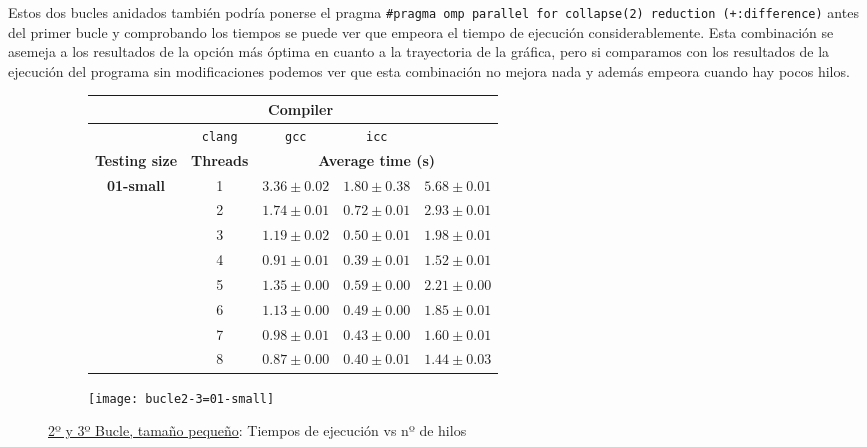 \par Estos dos bucles anidados también podría ponerse el pragma \texttt{\#pragma omp parallel for collapse(2) reduction (+:difference)}
antes del primer bucle y comprobando los tiempos se puede ver que empeora el tiempo de ejecución considerablemente. Esta combinación se asemeja a los resultados de 
la opción más óptima en cuanto a la trayectoria de la gráfica, pero si comparamos con los resultados de la ejecución del programa sin 
modificaciones podemos ver que esta combinación no mejora nada y además empeora cuando hay pocos hilos. 

\begin{figure}[H]
    \centering
    \begin{subfigure}{0.4\textwidth}
        \begin{adjustbox}{width=\textwidth} 
        \begin{tabular}{|c|c|c|c|c|}
            \hline
            \rowcolor{azul} \multicolumn{2}{|c|}{}&\multicolumn{3}{c|}{\textbf{Compiler}} \\ \hline
            \rowcolor{azul} \multicolumn{2}{|c|}{}&\texttt{clang}&\texttt{gcc}&\texttt{icc}\\ \hline
            \rowcolor{azul} \textbf{Testing size} & \textbf{Threads}&\multicolumn{3}{c|}{\textbf{Average time (s)}} \\ \hline
            \multirow{8}{1cm}{\textbf{01-small}} & 1 & \(3.36\pm{0.02}\) & \(1.80\pm{0.38}\) & \(5.68\pm{0.01}\) \\ \cline{2-5}
            & 2 & \(1.74\pm{0.01}\) & \(0.72\pm{0.01}\) & \(2.93\pm{0.01}\) \\ \cline{2-5}
            & 3 & \(1.19\pm{0.02}\) & \(0.50\pm{0.01}\) & \(1.98\pm{0.01}\) \\ \cline{2-5}
            & 4 & \(0.91\pm{0.01}\) & \(0.39\pm{0.01}\) & \(1.52\pm{0.01}\) \\ \cline{2-5}
            & 5 & \(1.35\pm{0.00}\) & \(0.59\pm{0.00}\) & \(2.21\pm{0.00}\) \\ \cline{2-5}
            & 6 & \(1.13\pm{0.00}\) & \(0.49\pm{0.00}\) & \(1.85\pm{0.01}\) \\ \cline{2-5}
            & 7 & \(0.98\pm{0.01}\) & \(0.43\pm{0.00}\) & \(1.60\pm{0.01}\) \\ \cline{2-5}
            & 8 & \(0.87\pm{0.00}\) & \(0.40\pm{0.01}\) & \(1.44\pm{0.03}\) \\ \hline
        \end{tabular}
        \end{adjustbox}
    \end{subfigure}
    \hfill
    \begin{subfigure}{0.5\textwidth}
        \texttt{[image: bucle2-3=01-small]}
    \end{subfigure}
    \caption{\underline{2º y 3º Bucle, tamaño pequeño}: Tiempos de ejecución vs nº de hilos}
    \label{fig:bucle2-3=01-small}
\end{figure}

